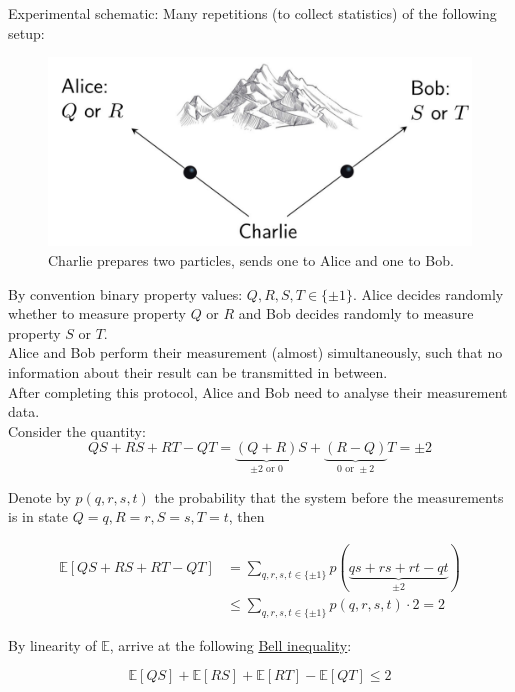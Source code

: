 Experimental schematic:  Many repetitions (to collect statistics) of the following setup:

\begin{figure}[H]
    \centering
    \includegraphics[scale=0.5]{chapters/res/alice-bob-charlie-mountain.png}
    \caption{Charlie prepares two particles, sends one to Alice and one to Bob.}
\end{figure}

By convention binary property values: $Q, R, S, T \in \{\pm 1 \}$. 
Alice decides randomly whether to measure property $Q$ or $R$ and Bob decides randomly to measure 
property $S$ or $T$. \\
Alice and Bob perform their measurement (almost) simultaneously, such that no information about their
result can be transmitted in between. \\ 
After completing this protocol, Alice and Bob need to analyse their measurement data. \\
Consider the quantity:
\begin{equation}
    QS + RS + RT - QT = \underbrace{(Q + R)}_{\pm 2 \text{ or } 0} S + \underbrace{(R - Q)}_{0 \text{ or } \pm 2} T
        = \pm 2
\end{equation}

Denote by $p(q, r, s, t)$ the probability that the system before the measurements is in state 
$Q = q, R = r, S = s, T = t$, then

\begin{align}
    \mathbb{E}[QS + RS + RT - QT] 
        &= \sum_{q, r, s, t \in \{\pm 1 \}} p(\underbrace{qs + rs + rt - qt}_{\pm 2}) \\ 
        &\leq \sum_{q, r, s, t \in \{\pm 1 \}} p(q, r, s, t) \cdot 2 = 2 
\end{align}

By linearity of $\mathbb{E}$, arrive at the following \underline{Bell inequality}:

\begin{equation}
    \mathbb{E}[QS] + \mathbb{E}[RS] + \mathbb{E}[RT] - \mathbb{E}[QT]
        \leq 2
\end{equation}

